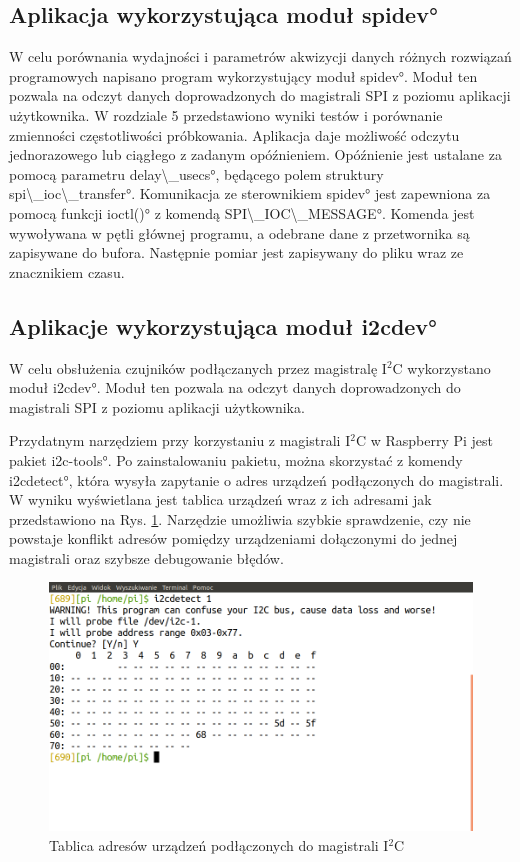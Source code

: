 \subsection{Aplikacja wykorzystująca moduł \ang{spidev}}

W celu porównania wydajności i parametrów akwizycji danych różnych rozwiązań programowych napisano program wykorzystujący moduł \ang{spidev}. Moduł ten pozwala na odczyt danych doprowadzonych do magistrali SPI z poziomu aplikacji użytkownika. W rozdziale 5 przedstawiono wyniki testów i porównanie zmienności częstotliwości próbkowania. Aplikacja daje możliwość odczytu jednorazowego lub ciągłego z zadanym opóźnieniem. Opóźnienie jest ustalane za pomocą parametru \ang{delay\_usecs}, będącego polem struktury \ang{spi\_ioc\_transfer}. Komunikacja ze sterownikiem \ang{spidev} jest zapewniona za pomocą funkcji \ang{ioctl()} z komendą \ang{SPI\_IOC\_MESSAGE}. Komenda jest wywoływana w pętli głównej programu, a odebrane dane z przetwornika są zapisywane do bufora. Następnie pomiar jest zapisywany do pliku wraz ze znacznikiem czasu.

\subsection{Aplikacje wykorzystująca moduł \ang{i2cdev}}

W celu obsłużenia czujników podłączanych przez magistralę I$^2$C wykorzystano moduł \ang{i2cdev}. Moduł ten pozwala na odczyt danych doprowadzonych do magistrali SPI z poziomu aplikacji użytkownika. 

Przydatnym narzędziem przy korzystaniu z magistrali I$^2$C w Raspberry Pi jest pakiet \ang{i2c-tools}. Po zainstalowaniu pakietu, można skorzystać z komendy \ang{i2cdetect}, która wysyła zapytanie o adres urządzeń podłączonych do magistrali. W wyniku wyświetlana jest tablica urządzeń wraz z ich adresami jak przedstawiono na Rys. \ref{fig:i2cdetect}. Narzędzie umożliwia szybkie sprawdzenie, czy nie powstaje konflikt adresów pomiędzy urządzeniami dołączonymi do jednej magistrali oraz szybsze debugowanie błędów.

\begin{figure}[h]
	\centering
		\includegraphics[width=13cm]{i2cdetect}
	\caption{Tablica adresów urządzeń podłączonych do magistrali I$^2$C} 
	\label{fig:i2cdetect}
\end{figure}


